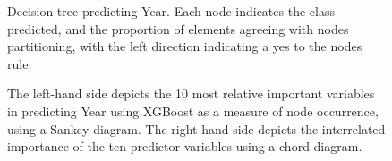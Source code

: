 \documentclass[review,12pt,authoryear]{elsarticle}
\begin{document}
\begin{linenumbers}
 \begin{figure}[htb]
  \caption{Decision tree predicting Year. Each node indicates the class predicted, and the proportion of elements agreeing with nodes partitioning, with the left direction indicating a yes to the nodes rule.}\label{fig:year_tree}
 \end{figure}
 
\begin{figure}[htb]
  \caption{The left-hand side depicts the 10 most relative important variables in predicting Year using XGBoost as a measure of node occurrence, using a Sankey diagram. The right-hand side depicts the interrelated importance of the ten predictor variables using a chord diagram.}\label{fig:year_sankey}
 \end{figure}


\end{linenumbers}
\end{document}
